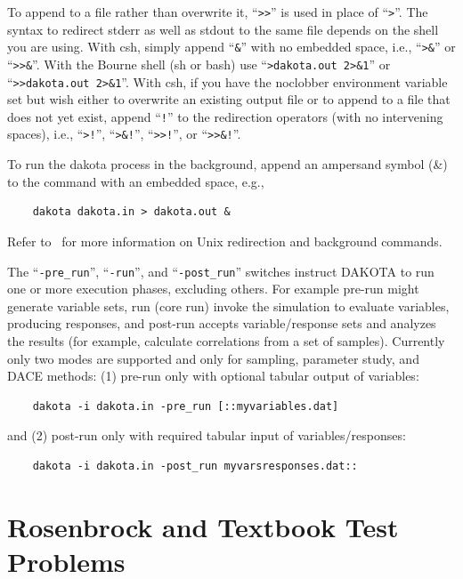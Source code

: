 To append to a file rather than overwrite it, ``\texttt{>>}'' is used
in place of ``\texttt{>}''. The syntax to redirect stderr as well as stdout
to the same file depends on the shell you are using.  With csh, simply append
``\texttt{\&}'' with no embedded space, i.e.,
``\texttt{>\&}'' or ``\texttt{>>\&}''. With the Bourne shell (sh or bash) use
``\texttt{>dakota.out 2>\&1}'' or ``\texttt{>>dakota.out 2>\&1}''.
With csh, if you have the noclobber environment variable set but
wish either to overwrite an existing output file or to append to a file that
does not yet exist, append ``\texttt{!}'' to the redirection operators
(with no intervening spaces), i.e.,
``\texttt{>!}'', ``\texttt{>\&!}'', ``\texttt{>>!}'', or
``\texttt{>>\&!}''.

To run the dakota process in the background, append an ampersand
symbol (\&) to the command with an embedded space, e.g.,
\begin{small}
\begin{verbatim}
    dakota dakota.in > dakota.out &
\end{verbatim}
\end{small}

Refer to~\cite{And86} for more information on Unix redirection and
background commands.

The ``\texttt{-pre\_run}'', ``\texttt{-run}'', and
``\texttt{-post\_run}'' switches instruct DAKOTA to run one or more
execution phases, excluding others.  For example pre-run might
generate variable sets, run (core run) invoke the simulation to
evaluate variables, producing responses, and post-run accepts
variable/response sets and analyzes the results (for example,
calculate correlations from a set of samples).  Currently only two
modes are supported and only for sampling, parameter study, and DACE
methods: (1) pre-run only with optional tabular output of variables:
\begin{small}
\begin{verbatim}
    dakota -i dakota.in -pre_run [::myvariables.dat]
\end{verbatim}
\end{small}
and (2) post-run only with required tabular input of variables/responses:
\begin{small}
\begin{verbatim}
    dakota -i dakota.in -post_run myvarsresponses.dat::
\end{verbatim}
\end{small}

 
\section{Rosenbrock and Textbook Test Problems}\label{tutorial:rosenbrock}

